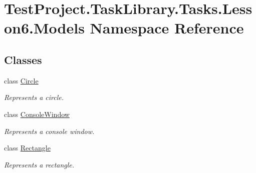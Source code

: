 \hypertarget{namespace_test_project_1_1_task_library_1_1_tasks_1_1_lesson6_1_1_models}{}\section{Test\+Project.\+Task\+Library.\+Tasks.\+Lesson6.\+Models Namespace Reference}
\label{namespace_test_project_1_1_task_library_1_1_tasks_1_1_lesson6_1_1_models}
\subsection*{Classes}
\begin{DoxyCompactItemize}
\item 
class \mbox{\hyperlink{class_test_project_1_1_task_library_1_1_tasks_1_1_lesson6_1_1_models_1_1_circle}{Circle}}
\begin{DoxyCompactList}\small\item\em Represents a circle. \end{DoxyCompactList}\item 
class \mbox{\hyperlink{class_test_project_1_1_task_library_1_1_tasks_1_1_lesson6_1_1_models_1_1_console_window}{Console\+Window}}
\begin{DoxyCompactList}\small\item\em Represents a console window. \end{DoxyCompactList}\item 
class \mbox{\hyperlink{class_test_project_1_1_task_library_1_1_tasks_1_1_lesson6_1_1_models_1_1_rectangle}{Rectangle}}
\begin{DoxyCompactList}\small\item\em Represents a rectangle. \end{DoxyCompactList}\end{DoxyCompactItemize}
